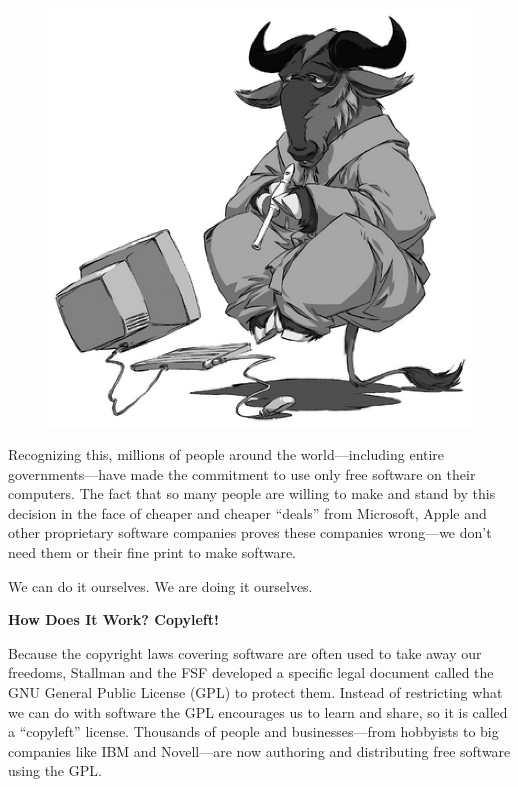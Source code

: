 \documentclass[twoside,12pt]{article}
\begin{document}
\begin{figure}
  \vspace{-0.25in}
  \begin{center}
    \includegraphics[scale=0.45]{gnu-think-smaller.eps}
  \end{center}
\end{figure}

Recognizing this, millions of people around the world---including entire
governments---have made the commitment to use only free software on their
computers. The fact that so many people are willing to make and stand by this
decision in the face of cheaper and cheaper ``deals'' from Microsoft, Apple and
other proprietary software companies proves these companies wrong---we don't
need them or their fine print to make software.

We can do it ourselves. We are doing it ourselves.

\begin{center}
{\Large\bf How Does It Work? Copyleft!}
\end{center}

Because the copyright laws covering software are often used to take away our
freedoms, Stallman and the FSF developed a specific legal document called the
GNU General Public License (GPL) to protect them. Instead of restricting what
we can do with software the GPL encourages us to learn and share, so it is
called a ``copyleft'' license. Thousands of people and businesses---from
hobbyists to big companies like IBM and Novell---are now authoring and
distributing free software using the GPL.
\end{document}
